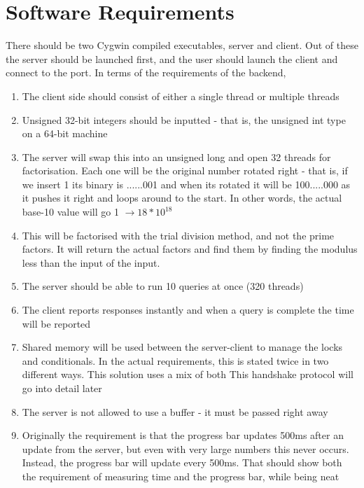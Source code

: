 \documentclass{article}
\begin{document}
    \section{Software Requirements}
    There should be two Cygwin compiled executables, server and client. Out
    of these the server should be launched first, and the user should launch
    the client and connect to the port.
    In terms of the requirements of the backend,
    \begin{enumerate}
        \item The client side should consist of either a single thread
        or multiple threads
        \item Unsigned 32-bit integers should be inputted - that is, the unsigned int
        type on a 64-bit machine
        \item The server will swap this into an unsigned long and open 32 threads
        for factorisation.
        Each one will be the original number rotated right - that is, if we insert 1
        its binary is ......001 and when its rotated it will be 100.....000 as
        it pushes it right and loops around to the start.
        In other words, the actual base-10 value will go 1 $\rightarrow 18*10^{18}$
        \item This will be factorised with the trial division method, and not the
        prime factors.
        It will return the actual factors and find them by finding the modulus
        less than the input of the input.
        \item The server should be able to run 10 queries at once (320 threads)
        \item The client reports responses instantly and when a query is complete
        the time will be reported
        \item Shared memory will be used between the server-client to manage the
        locks and conditionals.
        In the actual requirements, this is stated twice in two different ways.
        This solution uses a mix of both
        This handshake protocol will go into detail later
        \item The server is not allowed to use a buffer - it must be passed right away
        \item Originally the requirement is that the progress bar updates 500ms after
        an update from the server, but even with very large numbers this never occurs.
        Instead, the progress bar will update every 500ms.
        That should show both the requirement of measuring time and the progress bar,
        while being neat
    \end{enumerate}
\end{document}
